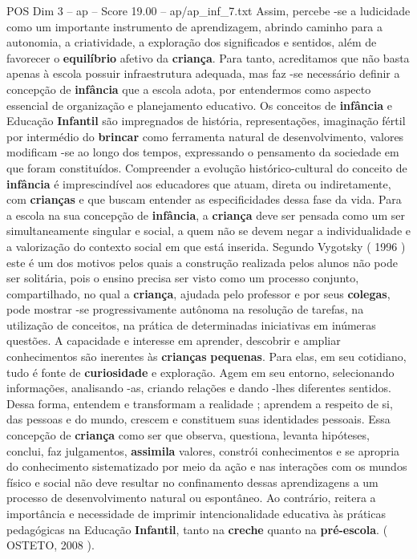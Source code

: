 \begin{textsample}{POS Dim 3 – ap – Score 19.00 – ap/ap\_inf\_7.txt}
Assim, percebe -se a ludicidade como um importante instrumento de aprendizagem, abrindo caminho para a autonomia, a criatividade, a exploração dos significados e sentidos, além de favorecer o \textbf{equilíbrio} afetivo da \textbf{criança}.
Para tanto, acreditamos que não basta apenas à escola possuir infraestrutura adequada, mas faz -se necessário definir a concepção de \textbf{infância} que a escola adota, por entendermos como aspecto essencial de organização e planejamento educativo.
Os conceitos de \textbf{infância} e Educação \textbf{Infantil} são impregnados de história, representações, imaginação fértil por intermédio do \textbf{brincar} como ferramenta natural de desenvolvimento, valores modificam -se ao longo dos tempos, expressando o pensamento da sociedade em que foram constituídos.
Compreender a evolução histórico-cultural do conceito de \textbf{infância} é imprescindível aos educadores que atuam, direta ou indiretamente, com \textbf{crianças} e que buscam entender as especificidades dessa fase da vida.
Para a escola na sua concepção de \textbf{infância}, a \textbf{criança} deve ser pensada como um ser simultaneamente singular e social, a quem não se devem negar a individualidade e a valorização do contexto social em que está inserida.
Segundo Vygotsky ( 1996 ) este é um dos motivos pelos quais a construção realizada pelos alunos não pode ser solitária, pois o ensino precisa ser visto como um processo conjunto, compartilhado, no qual a \textbf{criança}, ajudada pelo professor e por seus \textbf{colegas}, pode mostrar -se progressivamente autônoma na resolução de tarefas, na utilização de conceitos, na prática de determinadas iniciativas em inúmeras questões.
A capacidade e interesse em aprender, descobrir e ampliar conhecimentos são inerentes às \textbf{crianças} \textbf{pequenas}.
Para elas, em seu cotidiano, tudo é fonte de \textbf{curiosidade} e exploração.
Agem em seu entorno, selecionando informações, analisando -as, criando relações e dando -lhes diferentes sentidos.
Dessa forma, entendem e transformam a realidade ; aprendem a respeito de si, das pessoas e do mundo, crescem e constituem suas identidades pessoais.
Essa concepção de \textbf{criança} como ser que observa, questiona, levanta hipóteses, conclui, faz julgamentos, \textbf{assimila} valores, constrói conhecimentos e se apropria do conhecimento sistematizado por meio da ação e nas interações com os mundos físico e social não deve resultar no confinamento dessas aprendizagens a um processo de desenvolvimento natural ou espontâneo.
Ao contrário, reitera a importância e necessidade de imprimir intencionalidade educativa às práticas pedagógicas na Educação \textbf{Infantil}, tanto na \textbf{creche} quanto na \textbf{pré-escola}. ( OSTETO, 2008 ).

\end{textsample}
